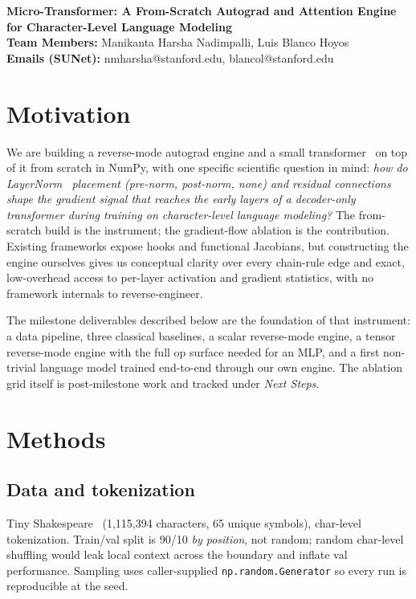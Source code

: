 \documentclass{article}
\makeatletter
\renewcommand{\maketitle}{
  \begin{center}
    {\bf \large Micro-Transformer: A From-Scratch Autograd and Attention Engine for Character-Level Language Modeling}\\
    \vspace{0.1cm}
    {\bf Team Members:} Manikanta Harsha Nadimpalli, Luis Blanco Hoyos\\
    \vspace{0.1cm}
    {\bf Emails (SUNet):} nmharsha@stanford.edu, blancol@stanford.edu\\
    \vspace{0.2cm}
  \end{center}
}
\makeatother
\begin{document}
\maketitle

\section{Motivation}
We are building a reverse-mode autograd engine and a small transformer~\cite{vaswani2017attention} on top of it from scratch in NumPy, with one specific scientific question in mind: \emph{how do LayerNorm~\cite{ba2016layernorm} placement (pre-norm, post-norm, none) and residual connections shape the gradient signal that reaches the early layers of a decoder-only transformer during training on character-level language modeling?} The from-scratch build is the instrument; the gradient-flow ablation is the contribution. Existing frameworks expose hooks and functional Jacobians, but constructing the engine ourselves gives us conceptual clarity over every chain-rule edge and exact, low-overhead access to per-layer activation and gradient statistics, with no framework internals to reverse-engineer.

The milestone deliverables described below are the foundation of that instrument: a data pipeline, three classical baselines, a scalar reverse-mode engine, a tensor reverse-mode engine with the full op surface needed for an MLP, and a first non-trivial language model trained end-to-end through our own engine. The ablation grid itself is post-milestone work and tracked under \emph{Next Steps}.

\section{Methods}

\subsection{Data and tokenization} Tiny Shakespeare~\cite{karpathy2015charrnn} (1{,}115{,}394 characters, 65 unique symbols), char-level tokenization. Train/val split is 90/10 \emph{by position}, not random; random char-level shuffling would leak local context across the boundary and inflate val performance. Sampling uses caller-supplied \texttt{np.random.Generator} so every run is reproducible at the seed.
\end{document}

